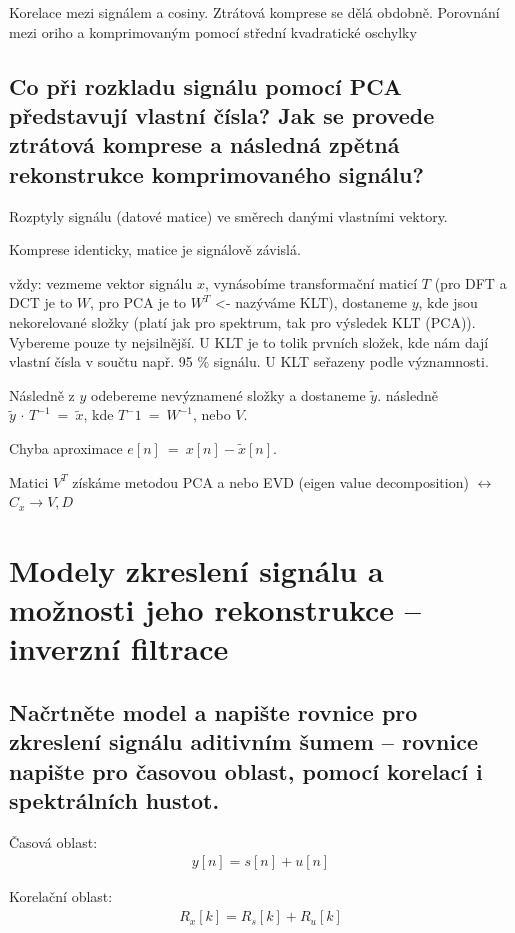 \documentclass[a4paper,12pt]{article}   %
\begin{document}
Korelace mezi signálem a cosiny. Ztrátová komprese se dělá obdobně. Porovnání mezi oriho a komprimovaným pomocí střední kvadratické oschylky

\subsection{Co při rozkladu signálu pomocí PCA představují vlastní čísla? Jak se provede ztrátová komprese a následná zpětná rekonstrukce komprimovaného signálu?}

Rozptyly signálu (datové matice) ve směrech danými vlastními vektory.

Komprese identicky, matice je signálově závislá.

vždy:
vezmeme vektor signálu $x$, vynásobíme transformační maticí $T$ (pro DFT a DCT je to $W$, pro PCA je to $W^T$ <- nazýváme KLT), dostaneme $y$, kde jsou nekorelované složky (platí jak pro spektrum, tak pro výsledek KLT (PCA)). Vybereme pouze ty nejsilnější. U KLT je to tolik prvních složek, kde nám dají vlastní čísla v součtu např. 95 \% signálu. U KLT seřazeny podle významnosti.

Následně z $y$ odebereme nevýznamené složky a dostaneme $\tilde{y}$. následně $\tilde{y}\,\cdot\,T^{-1}~=~\tilde{x}$, kde $T^-1~=~W^{-1}$, nebo $V$. 

Chyba aproximace $e[n]~=~x[n] - \tilde{x}[n]$.

Matici $V^T$ získáme metodou PCA a nebo EVD (eigen value decomposition) $\leftrightarrow$ $C_x \rightarrow V, D$


\newpage \section{Modely zkreslení signálu a možnosti jeho rekonstrukce – inverzní filtrace}
\subsection{Načrtněte model a napište rovnice pro zkreslení signálu aditivním šumem – rovnice napište pro časovou oblast, pomocí korelací i spektrálních hustot.}

Časová oblast:
\begin{align*}
        y[n] = s[n] + u[n]
\end{align*}

Korelační oblast:
\begin{align*}
        R_x[k] = R_s[k] + R_u[k]
\end{align*}
\end{document}
